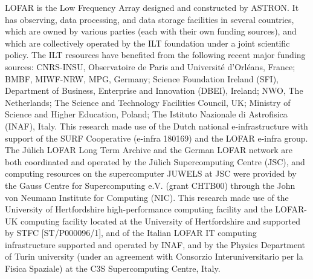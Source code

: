 \documentclass[usenatbib,fleqn,letters]{mnras}
\begin{document}
LOFAR is the Low Frequency Array designed and constructed by ASTRON. It has observing, data processing, and data storage facilities in several countries, which are owned by various parties (each with their own funding sources), and which are collectively operated by the ILT foundation under a joint scientific policy. The ILT resources have benefited from the following recent major funding sources: CNRS-INSU, Observatoire de Paris and Université d'Orléans, France; BMBF, MIWF-NRW, MPG, Germany; Science Foundation Ireland (SFI), Department of Business, Enterprise and Innovation (DBEI), Ireland; NWO, The Netherlands; The Science and Technology Facilities Council, UK; Ministry of Science and Higher Education, Poland; The Istituto Nazionale di Astrofisica (INAF), Italy. This research made use of the Dutch national e-infrastructure with support of the SURF Cooperative (e-infra 180169) and the LOFAR e-infra group. The Jülich LOFAR Long Term Archive and the German LOFAR network are both coordinated and operated by the Jülich Supercomputing Centre (JSC), and computing resources on the supercomputer JUWELS at JSC were provided by the Gauss Centre for Supercomputing e.V. (grant CHTB00) through the John von Neumann Institute for Computing (NIC). This research made use of the University of Hertfordshire high-performance computing facility and the LOFAR-UK computing facility located at the University of Hertfordshire and supported by STFC [ST/P000096/1], and of the Italian LOFAR IT computing infrastructure supported and operated by INAF, and by the Physics Department of Turin university (under an agreement with Consorzio Interuniversitario per la Fisica Spaziale) at the C3S Supercomputing Centre, Italy.


\begin{comment}
\section*{Appendix A}

\begin{figure*}
    \texttt{[image: figures/Lockman\_Unresolved\_03.png]}
    \hfill
    \texttt{[image: figures/ELAIS\_Unresolved\_03.png]}
    \caption{\label{fig:unres}The data and sigmoid fits to determine whether sources are resolved or unresolved as described in \S~\ref{subsec:highres}. The \textit{left} panel shows Lockman Hole, and the \textit{right} panel shows ELAIS-N1. }
\end{figure*}

Figure~\ref{fig:unres} shows the integrated flux density to peak brightness ratio as a function of the local signal to noise, parameterised by $\frac{S_{peak}}{2\sigma_{peak}} + \frac{S_{int}}{2\sigma_{int}}$. The data is first binned evenly in log space, and the 99.9th percentile is found in each bin. We then fit a sigmoid function:
\begin{equation}
y = A + \frac{B}{1 + (x / 96.57)^C}, 
\end{equation}
where 96.57 is a fixed value that has worked well for LoTSS \citep{shimwell_lofar_2022}. For Lockman Hole, we find 
\end{comment}







\label{lastpage}
\end{document}
